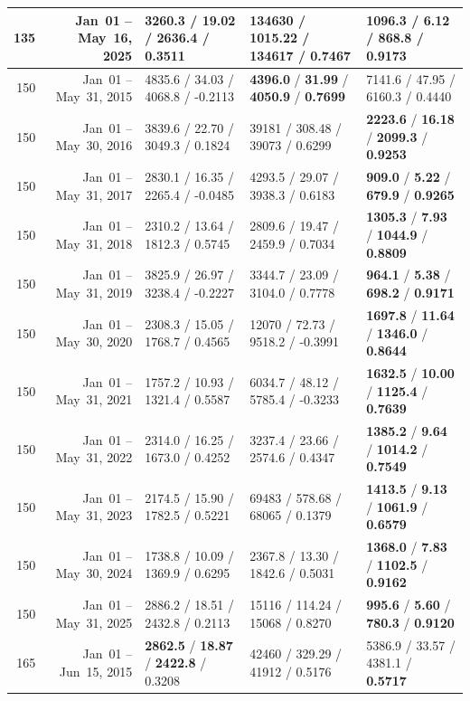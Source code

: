 \begin{longtable}{r r l l l}
135 & Jan~01 -- May~16, 2025 & 3260.3 / 19.02 / 2636.4 / 0.3511 & 134630 / 1015.22 / 134617 / 0.7467 & \textbf{1096.3} / \textbf{6.12} / \textbf{868.8} / \textbf{0.9173} \\
\midrule
150 & Jan~01 -- May~31, 2015 & 4835.6 / 34.03 / 4068.8 / -0.2113 & \textbf{4396.0} / \textbf{31.99} / \textbf{4050.9} / \textbf{0.7699} & 7141.6 / 47.95 / 6160.3 / 0.4440 \\
150 & Jan~01 -- May~30, 2016 & 3839.6 / 22.70 / 3049.3 / 0.1824 & 39181 / 308.48 / 39073 / 0.6299 & \textbf{2223.6} / \textbf{16.18} / \textbf{2099.3} / \textbf{0.9253} \\
150 & Jan~01 -- May~31, 2017 & 2830.1 / 16.35 / 2265.4 / -0.0485 & 4293.5 / 29.07 / 3938.3 / 0.6183 & \textbf{909.0} / \textbf{5.22} / \textbf{679.9} / \textbf{0.9265} \\
150 & Jan~01 -- May~31, 2018 & 2310.2 / 13.64 / 1812.3 / 0.5745 & 2809.6 / 19.47 / 2459.9 / 0.7034 & \textbf{1305.3} / \textbf{7.93} / \textbf{1044.9} / \textbf{0.8809} \\
150 & Jan~01 -- May~31, 2019 & 3825.9 / 26.97 / 3238.4 / -0.2227 & 3344.7 / 23.09 / 3104.0 / 0.7778 & \textbf{964.1} / \textbf{5.38} / \textbf{698.2} / \textbf{0.9171} \\
150 & Jan~01 -- May~30, 2020 & 2308.3 / 15.05 / 1768.7 / 0.4565 & 12070 / 72.73 / 9518.2 / -0.3991 & \textbf{1697.8} / \textbf{11.64} / \textbf{1346.0} / \textbf{0.8644} \\
150 & Jan~01 -- May~31, 2021 & 1757.2 / 10.93 / 1321.4 / 0.5587 & 6034.7 / 48.12 / 5785.4 / -0.3233 & \textbf{1632.5} / \textbf{10.00} / \textbf{1125.4} / \textbf{0.7639} \\
150 & Jan~01 -- May~31, 2022 & 2314.0 / 16.25 / 1673.0 / 0.4252 & 3237.4 / 23.66 / 2574.6 / 0.4347 & \textbf{1385.2} / \textbf{9.64} / \textbf{1014.2} / \textbf{0.7549} \\
150 & Jan~01 -- May~31, 2023 & 2174.5 / 15.90 / 1782.5 / 0.5221 & 69483 / 578.68 / 68065 / 0.1379 & \textbf{1413.5} / \textbf{9.13} / \textbf{1061.9} / \textbf{0.6579} \\
150 & Jan~01 -- May~30, 2024 & 1738.8 / 10.09 / 1369.9 / 0.6295 & 2367.8 / 13.30 / 1842.6 / 0.5031 & \textbf{1368.0} / \textbf{7.83} / \textbf{1102.5} / \textbf{0.9162} \\
150 & Jan~01 -- May~31, 2025 & 2886.2 / 18.51 / 2432.8 / 0.2113 & 15116 / 114.24 / 15068 / 0.8270 & \textbf{995.6} / \textbf{5.60} / \textbf{780.3} / \textbf{0.9120} \\
\midrule
165 & Jan~01 -- Jun~15, 2015 & \textbf{2862.5} / \textbf{18.87} / \textbf{2422.8} / 0.3208 & 42460 / 329.29 / 41912 / 0.5176 & 5386.9 / 33.57 / 4381.1 / \textbf{0.5717} \\

\end{longtable}
